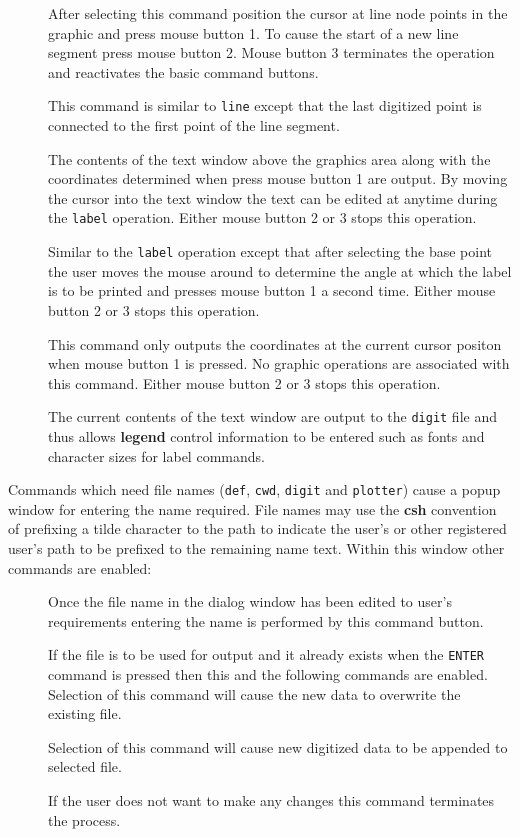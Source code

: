 \begin{description}
\item[]
After selecting this command position the cursor at line
node points in the graphic and press mouse button 1.
To cause the start of a new line segment press mouse button 2.
Mouse button 3 terminates the operation and reactivates
the basic command buttons.
\item[]
This command is similar to {\tt line} except that the last
digitized point is connected to the first point of the line
segment.
\item[]
The contents of the text window above the graphics area along
with the coordinates determined when press mouse button 1 are
output.
By moving the cursor into the text window the text can be
edited at anytime during the {\tt label} operation.
Either mouse button 2 or 3 stops this operation.
\item[]
Similar to the {\tt label} operation except that after selecting
the base point the user moves the mouse around to determine
the angle at which the label is to be printed and presses
mouse button 1 a second time.
Either mouse button 2 or 3 stops this operation.
\item[]
This command only outputs the coordinates at the current
cursor positon when mouse button 1 is pressed.
No graphic operations are associated with this command.
Either mouse button 2 or 3 stops this operation.
\item[]
The current contents of the text window are output
to the {\tt digit} file and thus
allows {\bf legend} control information to be entered
such as fonts and character sizes for label commands.
\end{description}

Commands which need file names
({\tt def}, {\tt cwd}, {\tt digit} and {\tt plotter})
cause a popup window for
entering the name required.
File names may use the {\bf csh} convention of prefixing
a tilde character to the path to indicate the user's or
other registered user's path to be prefixed to the
remaining name text.
Within this window other commands are enabled:
\begin{description}
\item[]
Once the file name in the dialog window has been edited
to user's requirements entering the name is performed
by this command button.
\item[]
If the file is to be used for output and it
already exists when the {\tt ENTER}
command is pressed then this and the following commands
are enabled.
Selection of this command will cause the new data to
overwrite the existing file.
\item[]
Selection of this command will
cause new digitized data to be appended to selected file.
\item[]
If the user does not want to make any changes this command
terminates the process.
\end{description}

